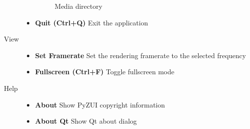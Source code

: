 \documentclass{report}
\begin{document}
\begin{description}
\begin{itemize}
\begin{figure}[h!]
\begin{center}
              \caption{Media directory} \label{fig:grid}
            \end{center}
            \end{figure}
      \item \textbf{Quit (Ctrl+Q)} Exit the application
    \end{itemize}
    \item[View]
    \begin{itemize}
      \item \textbf{Set Framerate}
            Set the rendering framerate to the selected frequency
      \item \textbf{Fullscreen (Ctrl+F)} Toggle fullscreen mode
    \end{itemize}
    \item[Help]
    \begin{itemize}
      \item \textbf{About} Show PyZUI copyright information
      \item \textbf{About Qt} Show Qt about dialog
    \end{itemize}
  \end{description}

  \pagebreak
\end{document}
